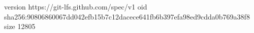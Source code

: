 version https://git-lfs.github.com/spec/v1
oid sha256:90806860067dd042efb15b7c12dacece641fb6b397efa98ed9cdda0b769a38f8
size 12805
